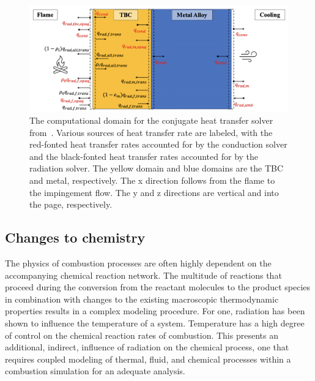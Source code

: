 \begin{figure}
\centering
\includegraphics[width=1\linewidth]{figures/ch2/TBC.png}
\caption{The computational domain for the conjugate heat transfer solver from~\cite{Tricard2021ModelingEnvironments.}. Various sources of heat transfer rate are labeled, with the red-fonted heat transfer rates accounted for by the conduction solver and the black-fonted heat transfer rates accounted for by the radiation solver. The yellow domain and blue domains are the TBC and metal, respectively. The x direction follows from the flame to the impingement flow. The y and z directions are vertical and into the page, respectively. }
\label{fig:TBC}
\end{figure}

\subsection{Changes to chemistry}
The physics of combustion processes are often highly dependent on the accompanying chemical reaction network.
The multitude of reactions that proceed during the conversion from the reactant molecules to the product species in combination with changes to the existing macroscopic thermodynamic properties results in a complex modeling procedure.
For one, radiation has been shown to influence the temperature of a system. Temperature has a high degree of control on the chemical reaction rates of combustion.
This presents an additional, indirect, influence of radiation on the chemical process, one that requires coupled modeling of thermal, fluid, and chemical processes within a combustion simulation for an adequate analysis.

